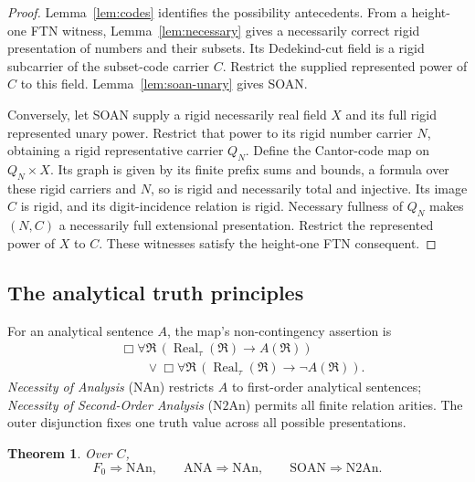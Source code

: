 \documentclass[11pt,letterpaper,numbers=noenddot]{scrartcl}
\numberwithin{equation}{section}
\newtheorem{theorem}{Theorem}[section]
\theoremstyle{definition}
\newcommand{\Real}{\operatorname{Real}}
\newcommand{\SOAN}{\mathrm{SOAN}}
\newcommand{\ANA}{\mathrm{ANA}}
\newcommand{\NAn}{\mathrm{NAn}}
\newcommand{\Ntwo}{\mathrm{N2An}}
\begin{document}
\begin{proof}
Lemma~\ref{lem:codes} identifies the possibility antecedents. From a height-one FTN witness, Lemma~\ref{lem:necessary} gives a necessarily correct rigid presentation of numbers and their subsets. Its Dedekind-cut field is a rigid subcarrier of the subset-code carrier $C$. Restrict the supplied represented power of $C$ to this field. Lemma~\ref{lem:soan-unary} gives SOAN.

Conversely, let SOAN supply a rigid necessarily real field $X$ and its full rigid represented unary power. Restrict that power to its rigid number carrier $N$, obtaining a rigid representative carrier $Q_N$. Define the Cantor-code map on $Q_N\times X$. Its graph is given by its finite prefix sums and bounds, a formula over these rigid carriers and $N$, so is rigid and necessarily total and injective. Its image $C$ is rigid, and its digit-incidence relation is rigid. Necessary fullness of $Q_N$ makes $(N,C)$ a necessarily full extensional presentation. Restrict the represented power of $X$ to $C$. These witnesses satisfy the height-one FTN consequent.
\end{proof}

\subsection{The analytical truth principles}

For an analytical sentence $A$, the map's non-contingency assertion is
\begin{equation}\label{eq:analytic-truth}
\begin{split}
&\Box\forall\mathfrak R\,
 (\Real_\tau(\mathfrak R)\to A(\mathfrak R))\\
&\qquad{}\lor
\Box\forall\mathfrak R\,
 (\Real_\tau(\mathfrak R)\to\neg A(\mathfrak R)).
\end{split}
\end{equation}
\emph{Necessity of Analysis} ($\NAn$) restricts $A$ to first-order analytical sentences; \emph{Necessity of Second-Order Analysis} ($\Ntwo$) permits all finite relation arities. The outer disjunction fixes one truth value across all possible presentations.

\begin{theorem}\label{thm:analysis}
Over $C$,
\[
F_0\Rightarrow\NAn,\qquad
\ANA\Rightarrow\NAn,\qquad
\SOAN\Rightarrow\Ntwo.
\]
\end{theorem}
\end{document}
